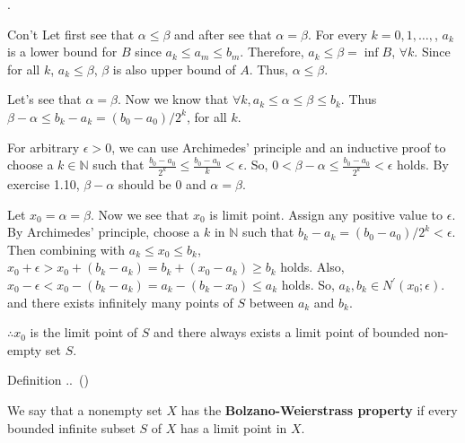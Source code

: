 \documentclass[8pt]{beamer}
\newcounter{defn}
\newcounter{ex}
\newcounter{exer}
\renewcommand{\thedefn}{\thesection.\thesubsection.\arabic{defn}}
\renewenvironment{definition}[1][]{%
    \refstepcounter{defn}%
    \begin{block}{Definition \thedefn\if\relax\detokenize{#1}\relax\else\ (#1)\fi}%
}{%
    \end{block}%
}
\newcommand{\mbb}[1]{\mathbb{#1}}
\newcommand{\tb}[1]{\textbf{#1}}
\begin{document}
\begin{frame}{.}
    \begin{block}{Con't}
        Let first see that $\alpha \leq \beta$ and after see that $\alpha = \beta$.
        For every $k=0, 1, \dots,$, $a_k$ is a lower bound for $B$ since $a_k \leq a_m \leq b_m$.
        Therefore, $a_k \leq \beta = \inf B$, $\forall k$.
        Since for all $k$, $a_k \leq \beta$, $\beta$ is also upper bound of $A$. Thus, $\alpha \leq \beta$.

        Let's see that $\alpha = \beta$.
        Now we know that $\forall k, a_k \leq \alpha \leq \beta \leq b_k$.
        Thus $\beta - \alpha \leq b_k - a_k = (b_0 - a_0)/2^{k}$, for all $k$.

        For arbitrary $\epsilon > 0$, we can use Archimedes' principle and an inductive proof to choose a $k \in \mbb{N}$
        such that $ \frac{b_0- a_0}{2^k} \leq \frac{b_0 - a_0}{k} <\epsilon$.
        So, $0 < \beta - \alpha \leq \frac{b_0-a_0}{2^k} < \epsilon$ holds.
        By exercise 1.10, $\beta - \alpha$ should be $0$ and $\alpha = \beta$.

        Let $x_0 = \alpha = \beta$.
        Now we see that $x_0$ is limit point.
        Assign any positive value to $\epsilon$.
        By Archimedes' principle, choose a $k$ in $\mbb{N}$ such that $ b_k - a_k = (b_0 - a_0)/2^k <\epsilon$.
        Then combining with $a_k \leq x_0 \leq b_k$, $x_0 + \epsilon > x_0 + (b_k - a_k) = b_k + (x_0 - a_k) \geq b_k$ holds.
        Also, $x_0 - \epsilon < x_0 - (b_k - a_k) = a_k - (b_k - x_0) \leq a_k$ holds.
        So, $a_k, b_k \in N^\prime(x_0; \epsilon)$. and there exists infinitely many points of $S$ between $a_k$ and $b_k$.

        $\therefore x_0$ is the limit point of $S$ and there always exists a limit point of bounded non-empty set $S$.
    \end{block}

    \begin{definition}
        We say that a nonempty set $X$ has the \tb{Bolzano-Weierstrass property} if every bounded infinite subset $S$ of $X$ has a limit point in $X$. 
    \end{definition}
\end{frame}
\end{document}

